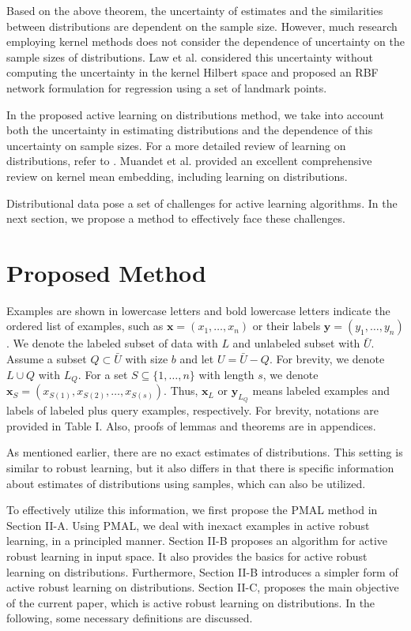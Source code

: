 \documentclass[10pt,twocolumn]{IEEEtran}
\begin{document}
	Based on the above theorem, the uncertainty of estimates and the similarities between distributions are dependent on the sample size. However, much research employing kernel methods does not consider the dependence of uncertainty on the sample sizes of distributions. Law et al. \cite{law2017bayesian} considered this uncertainty without computing the uncertainty in the kernel Hilbert space and proposed an RBF network formulation for regression using a set of landmark points.
	
	In the proposed active learning on distributions method, we take into account both the uncertainty in estimating distributions and the dependence of this uncertainty on sample sizes. For a more detailed review of learning on distributions, refer to \cite{szabo2016learning}. Muandet et al. \cite{muandet2017kernel} provided an excellent comprehensive review on kernel mean embedding, including learning on distributions.
	
	Distributional data pose a set of challenges for active learning algorithms. In the next section, we propose a method to effectively face these challenges.
	
	\section{Proposed Method}
	
	Examples are shown in lowercase letters and bold lowercase letters indicate the ordered list of examples, such as $\mathbf{x} = (x_1, \ldots, x_n)$ or their labels $\mathbf{y} = (y_1, \ldots, y_n)$. We denote the labeled subset of data with $L$ and unlabeled subset with $\bar{U}$. Assume a subset $Q \subset \bar{U}$ with size $b$ and let $U = \bar{U} - Q$. For brevity, we denote $L \cup Q$ with $L_Q$. For a set $S \subseteq \{1, \ldots, n\}$ with length $s$, we denote $\mathbf{x}_S = (x_{S(1)}, x_{S(2)}, \ldots, x_{S(s)})$. Thus, $\mathbf{x}_L$ or $\mathbf{y}_{L_Q}$ means labeled examples and labels of labeled plus query examples, respectively. For brevity, notations are provided in Table I. Also, proofs of lemmas and theorems are in appendices.
	
	As mentioned earlier, there are no exact estimates of distributions. This setting is similar to robust learning, but it also differs in that there is specific information about estimates of distributions using samples, which can also be utilized.
	
	To effectively utilize this information, we first propose the PMAL method in Section II-A. Using PMAL, we deal with inexact examples in active robust learning, in a principled manner. Section II-B proposes an algorithm for active robust learning in input space. It also provides the basics for active robust learning on distributions. Furthermore, Section II-B introduces a simpler form of active robust learning on distributions. Section II-C, proposes the main objective of the current paper, which is active robust learning on distributions. In the following, some necessary definitions are discussed.
	
\end{document}
